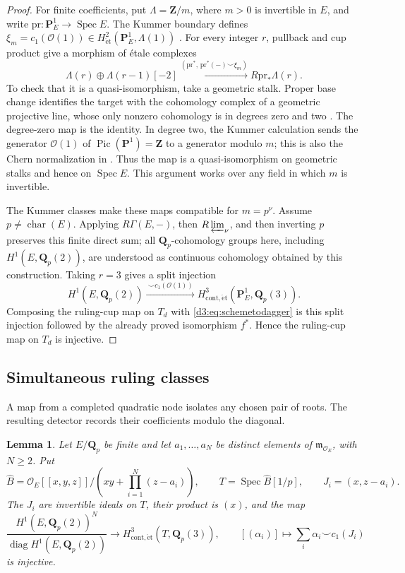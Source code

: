 \documentclass[11pt,a4paper]{amsart}
\numberwithin{equation}{section}
\newtheorem{lemma}[theorem]{Lemma}
\theoremstyle{definition}
\theoremstyle{remark}
\newcommand{\Q}{\mathbf Q}
\newcommand{\Z}{\mathbf Z}
\newcommand{\PP}{\mathbf P}
\newcommand{\OO}{\mathcal O}
\newcommand{\Spec}{\operatorname{Spec}}
\newcommand{\Pic}{\operatorname{Pic}}
\begin{document}
\begin{proof}
For finite coefficients, put $\Lambda=\Z/m$, where $m>0$ is
invertible in $E$, and write
$\mathrm{pr}\colon\PP^1_E\to\Spec E$.
The Kummer boundary defines
$\xi_m=c_1(\OO(1))\in H^2_{\mathrm{\acute et}}(\PP^1_E,\Lambda(1))$
\cite[Example~7.9(a)]{MilneEtale}.
For every integer $r$, pullback and cup product give a morphism
of \'etale complexes
\begin{equation}\label{d3:eq:finitePonebundle}
 \Lambda(r)\oplus\Lambda(r-1)[-2]
 \xrightarrow{(\mathrm{pr}^*,\,\mathrm{pr}^*(-)\smile\xi_m)}
 R\mathrm{pr}_*\Lambda(r).
\end{equation}
To check that it is a quasi-isomorphism, take a geometric stalk.
Proper base change identifies the target with the cohomology
complex of a geometric projective line, whose only nonzero
cohomology is in degrees zero and two
\cite[Proposition~14.2 and Theorems~17.7 and~17.10]{MilneEtale}.
The degree-zero map is the identity.
In degree two, the Kummer calculation sends the generator
$\OO(1)$ of $\Pic(\PP^1)=\Z$ to a generator modulo $m$;
this is also the Chern normalization in
\cite[Theorems~23.2 and~23.3(b)]{MilneEtale}.
Thus the map is a quasi-isomorphism on geometric stalks and
hence on $\Spec E$. This argument works over any field in
which $m$ is invertible.

The Kummer classes make these maps compatible for $m=p^\nu$.
Assume $p\ne\operatorname{char}(E)$.
Applying $R\Gamma(E,-)$, then $R\varprojlim_\nu$, and then
inverting $p$ preserves this finite direct sum; all
$\Q_p$-cohomology groups here, including $H^1(E,\Q_p(2))$,
are understood as continuous cohomology obtained by this
construction. Taking $r=3$ gives a split injection
\[
 H^1(E,\Q_p(2))
 \xrightarrow{\ \smile c_1(\OO(1))\ }
 H^3_{\mathrm{cont},\mathrm{\acute et}}(\PP^1_E,\Q_p(3)).
\]
Composing the ruling-cup map on $T_d$ with
\eqref{d3:eq:schemetodagger} is this split injection followed
by the already proved isomorphism $f^*$.
Hence the ruling-cup map on $T_d$ is injective.
\end{proof}

\subsection{Simultaneous ruling classes}
A map from a completed quadratic node isolates any chosen pair of roots.
The resulting detector records their coefficients modulo the diagonal.

\begin{lemma}\label{d3:lem:completedrootcup}\label{d3:lem:completedtamecup}
Let $E/\Q_p$ be finite and let $a_1,\ldots,a_N$ be distinct elements of $\mathfrak m_{\OO_E}$, with $N\geq2$. Put
\[
\widehat B=\OO_E[[x,y,z]]/
\left(xy+\prod_{i=1}^N(z-a_i)\right),
\qquad T=\Spec\widehat B[1/p],
\qquad J_i=(x,z-a_i).
\]
The $J_i$ are invertible ideals on $T$, their product is $(x)$, and the map
\begin{equation}\label{d3:eq:completedtamecup}
\frac{H^1(E,\Q_p(2))^N}
{\operatorname{diag}H^1(E,\Q_p(2))}
\longrightarrow H^3_{\mathrm{cont},\mathrm{\acute et}}(T,\Q_p(3)),
\qquad
[(\alpha_i)]\longmapsto\sum_i\alpha_i\smile c_1(J_i)
\end{equation}
is injective.
\end{lemma}
\end{document}
